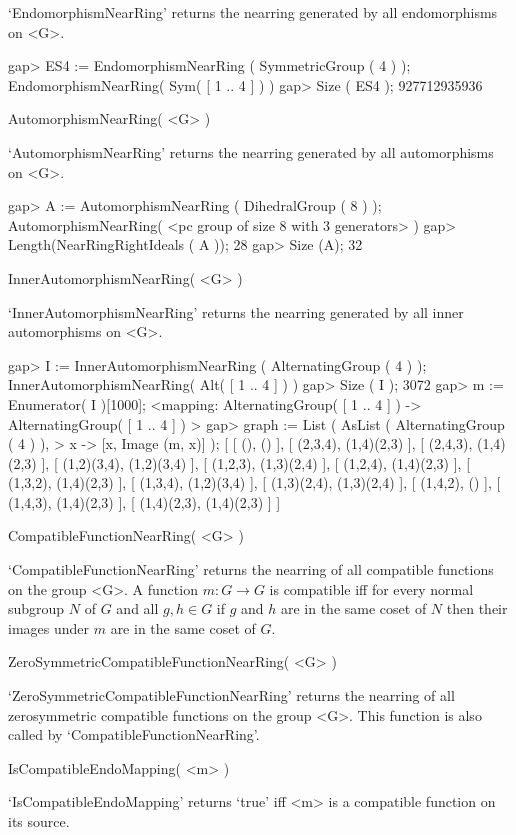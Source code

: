 `EndomorphismNearRing' returns the nearring generated by all endomorphisms
on <G>.

\beginexample
    gap> ES4 := EndomorphismNearRing ( SymmetricGroup ( 4 ) );
    EndomorphismNearRing( Sym( [ 1 .. 4 ] ) )
    gap> Size ( ES4 );
    927712935936
\endexample

\>AutomorphismNearRing( <G> )

`AutomorphismNearRing' returns the nearring generated by all automorphisms
on <G>.

\beginexample
    gap> A := AutomorphismNearRing ( DihedralGroup ( 8 ) );
    AutomorphismNearRing( <pc group of size 8 with 3 generators> )
    gap> Length(NearRingRightIdeals ( A ));
    28
    gap> Size (A);
    32
\endexample

\>InnerAutomorphismNearRing( <G> )

`InnerAutomorphismNearRing' returns the nearring generated by all inner
automorphisms on <G>.

\beginexample
    gap> I := InnerAutomorphismNearRing ( AlternatingGroup ( 4 ) );
    InnerAutomorphismNearRing( Alt( [ 1 .. 4 ] ) )
    gap> Size ( I );
    3072
    gap> m := Enumerator( I )[1000];
    <mapping: AlternatingGroup( [ 1 .. 4 ] ) -> AlternatingGroup( [ 1 .. 4 ] ) >
    gap> graph := List ( AsList ( AlternatingGroup ( 4 ) ),
    > x -> [x, Image (m, x)] );
    [ [ (), () ], [ (2,3,4), (1,4)(2,3) ], [ (2,4,3), (1,4)(2,3) ],
      [ (1,2)(3,4), (1,2)(3,4) ], [ (1,2,3), (1,3)(2,4) ],
      [ (1,2,4), (1,4)(2,3) ], [ (1,3,2), (1,4)(2,3) ], [ (1,3,4), (1,2)(3,4) ],
      [ (1,3)(2,4), (1,3)(2,4) ], [ (1,4,2), () ], [ (1,4,3), (1,4)(2,3) ],
      [ (1,4)(2,3), (1,4)(2,3) ] ]
\endexample

\>CompatibleFunctionNearRing( <G> )

`CompatibleFunctionNearRing' returns the nearring of all compatible functions
on the group <G>. A function $m:G \rightarrow G$ is compatible iff for every normal
subgroup $N$ of $G$ and all $g,h \in G$ if $g$ and $h$ are in the same coset of $N$
then their images under $m$ are in the same coset of $G$.

\>ZeroSymmetricCompatibleFunctionNearRing( <G> )

`ZeroSymmetricCompatibleFunctionNearRing' returns the nearring of all zerosymmetric
compatible functions on the group <G>. This function is also called by 
`CompatibleFunctionNearRing'.

\>IsCompatibleEndoMapping( <m> )

`IsCompatibleEndoMapping' returns `true' iff <m> is a compatible function on its 
source.

